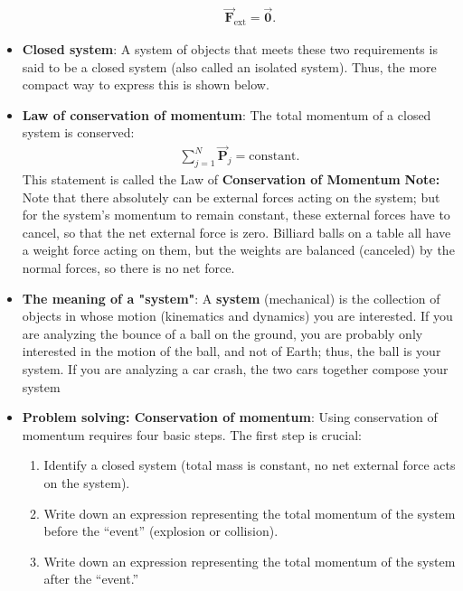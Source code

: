 \documentclass{report}
\begin{document}
\begin{itemize}
\begin{itemize}
                    \begin{align*}
                        \vec{\mathbf{F}}_{\text{ext}} = \vec{\mathbf{0}}
                    .\end{align*}
            \end{itemize}
        \item \textbf{Closed system}:
            A system of objects that meets these two requirements is said to be a closed system (also called an isolated system). Thus, the more compact way to express this is shown below.
        \item \textbf{Law of conservation of momentum}:
            The total momentum of a closed system is conserved:
            \begin{align*}
                \sum_{j=1}^{N}\vec{\mathbf{P}}_{j} = \text{constant}
            .\end{align*}
            \bigbreak \noindent 
            This statement is called the Law of \textbf{Conservation of Momentum}
            \bigbreak \noindent 
            \textbf{Note:} Note that there absolutely can be external forces acting on the system; but for the system’s momentum to remain constant, these external forces have to cancel, so that the net external force is zero. Billiard balls on a table all have a weight force acting on them, but the weights are balanced (canceled) by the normal forces, so there is no net force.
        \item \textbf{The meaning of a "system"}:
            A \textbf{system} (mechanical) is the collection of objects in whose motion (kinematics and dynamics) you are interested. If you are analyzing the bounce of a ball on the ground, you are probably only interested in the motion of the ball, and not of Earth; thus, the ball is your system. If you are analyzing a car crash, the two cars together compose your system
        \item \textbf{Problem solving: Conservation of momentum}:
            Using conservation of momentum requires four basic steps. The first step is crucial:
            \begin{enumerate}
                \item Identify a closed system (total mass is constant, no net external force acts on the system).
                \item Write down an expression representing the total momentum of the system before the “event” (explosion or collision).
                \item Write down an expression representing the total momentum of the system after the “event.”

\end{enumerate}
\end{itemize}
\end{document}
